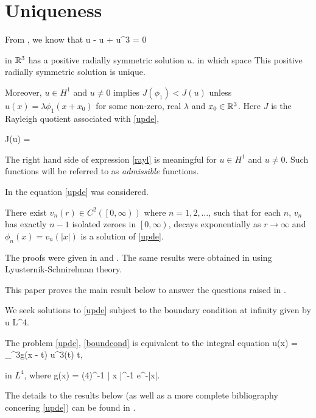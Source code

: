 \newcommand{\intrrr}{\int_{\R^3}}
\chapter{Uniqueness}

From \cite{nehari}, we know that
\be\label{upde}
\Delta u - u + u^3 = 0
\ee

in $\mathbb{R}^3$ has a positive radially symmetric solution $u$. {\red in which space}
This positive radially symmetric solution is unique. 

Moreover, $u \in H^1$ and $u\neq 0$ implies $J(\phi_1) < J(u)$ unless
$u(x) = \lambda \phi_1 \left( x + x_0 \right)$ for some non-zero, real $\lambda$
and $x_0 \in \mathbb{R}^3$. Here $J$ is the Rayleigh quotient associated with
\eqref{upde},

\be\label{rayl}
J(u) = 
\ee

The right hand side of expression \eqref{rayl} is meaningful for $u\in H^1$ and
$u\neq 0$. Such functions will be referred to as \emph{admissible} functions.

In \cite{finkelstein} the equation \eqref{upde} was considered.

\begin{lemma}\label{coff1}
There exist $v_n(r) \in C^2\left( \left[0, \infty \right) \right)$ where $n=1, 2,
\ldots$, such that for each $n$, $v_n$ has exactly $n-1$ isolated zeroes in
$\left[0, \infty \right)$, decays exponentially as $r\to\infty$ and $\phi_n(x) =
v_n(|x|)$ is a solution of \eqref{upde}.
\end{lemma}

The proofs were given in %
\cite{nehari} and \cite{ryder}. The same
results were obtained in \cite{berger} using Lyusternik-Schnirelman theory.

This paper proves the main result %
below to answer the questions raised in \cite{robinson}.

We seek solutions to \eqref{upde} subject to the boundary condition at infinity
given by
\be\label{boundcond} u \in L^4. \ee

The problem \eqref{upde}, \eqref{boundcond} is equivalent to the integral
equation
\be\label{inteq} u(x) = \intrrr g(x - t) u^3(t) \diff t, \ee

in $L^4$, where
\be\label{testfunc} g(x) = (4\pi)^{-1} \left| x \right|^{-1} e^{-|x|}. \ee

The details to the results below (as well as a more complete bibliography
concering \eqref{upde}) can be found in \cite{coffmcarn}.

